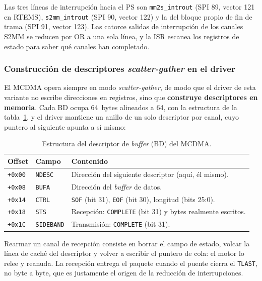 Las tres líneas de interrupción hacia el PS son \texttt{mm2s\_introut} (SPI 89, vector 121 en
RTEMS), \texttt{s2mm\_introut} (SPI 90, vector 122) y la del bloque propio de fin de trama (SPI
91, vector 123). Las catorce salidas de interrupción de los canales S2MM se reducen por OR a una
sola línea, y la ISR escanea los registros de estado para saber qué canales han completado.

\subsubsection{Construcción de descriptores \textit{scatter-gather} en el driver}

El MCDMA opera siempre en modo \textit{scatter-gather}, de modo que el driver de esta variante
no escribe direcciones en registros, sino que \textbf{construye descriptores en memoria}. Cada
BD ocupa 64~bytes alineados a 64, con la estructura de la tabla~\ref{tab:mcdma_bd}, y el driver
mantiene un anillo de un solo descriptor por canal, cuyo puntero al siguiente apunta a sí mismo:

\begin{table}[H]
    \centering
    \begin{tabular}{lll}
        \hline
        \textbf{Offset} & \textbf{Campo} & \textbf{Contenido} \\
        \hline
        \texttt{+0x00} & \texttt{NDESC}   & Dirección del siguiente descriptor (aquí, él mismo). \\
        \texttt{+0x08} & \texttt{BUFA}    & Dirección del \textit{buffer} de datos. \\
        \texttt{+0x14} & \texttt{CTRL}    & \texttt{SOF} (bit 31), \texttt{EOF} (bit 30), longitud (bits 25:0). \\
        \texttt{+0x18} & \texttt{STS}     & Recepción: \texttt{COMPLETE} (bit 31) y bytes realmente escritos. \\
        \texttt{+0x1C} & \texttt{SIDEBAND} & Transmisión: \texttt{COMPLETE} (bit 31). \\
        \hline
    \end{tabular}
    \caption{Estructura del descriptor de \textit{buffer} (BD) del MCDMA.}
    \label{tab:mcdma_bd}
\end{table}

Rearmar un canal de recepción consiste en borrar el campo de estado, volcar la línea de caché
del descriptor y volver a escribir el puntero de cola: el motor lo relee y reanuda. La
recepción entrega el paquete cuando el puente cierra el \texttt{TLAST}, no byte a byte, que es
justamente el origen de la reducción de interrupciones.

